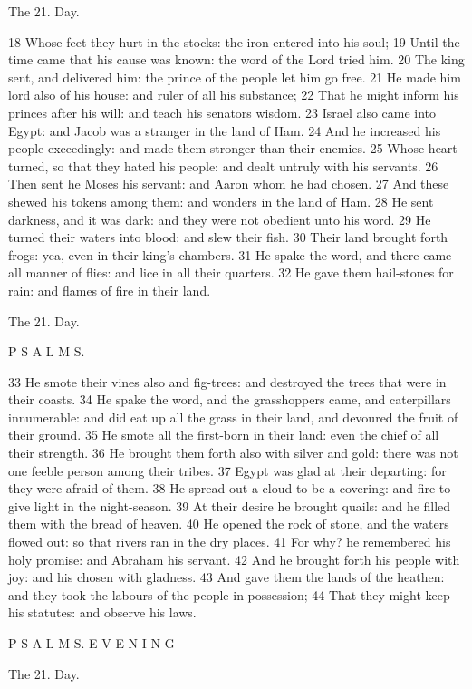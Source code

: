 The 21. Day.

18 Whose feet they hurt in the stocks: the iron entered into his soul; 19 Until the time came that his cause was known: the word of the Lord tried him. 20 The king sent, and delivered him: the prince of the people let him go free. 21 He made him lord also of his house: and ruler of all his substance; 22 That he might inform his princes after his will: and teach his senators wisdom. 23 Israel also came into Egypt: and Jacob was a stranger in the land of Ham. 24 And he increased his people exceedingly: and made them stronger than their enemies. 25 Whose heart turned, so that they hated his people: and dealt untruly with his servants. 26 Then sent he Moses his servant: and Aaron whom he had chosen. 27 And these shewed his tokens among them: and wonders in the land of Ham. 28 He sent darkness, and it was dark: and they were not obedient unto his word. 29 He turned their waters into blood: and slew their fish. 30 Their land brought forth frogs: yea, even in their king’s chambers. 31 He spake the word, and there came all manner of flies: and lice in all their quarters. 32 He gave them hail-stones for rain: and flames of fire in their land.

The 21. Day.

P S A L M S.

33 He smote their vines also and fig-trees: and destroyed the trees that were in their coasts. 34 He spake the word, and the grasshoppers came, and caterpillars innumerable: and did eat up all the grass in their land, and devoured the fruit of their ground. 35 He smote all the first-born in their land: even the chief of all their strength. 36 He brought them forth also with silver and gold: there was not one feeble person among their tribes. 37 Egypt was glad at their departing: for they were afraid of them. 38 He spread out a cloud to be a covering: and fire to give light in the night-season. 39 At their desire he brought quails: and he filled them with the bread of heaven. 40 He opened the rock of stone, and the waters flowed out: so that rivers ran in the dry places. 41 For why? he remembered his holy promise: and Abraham his servant. 42 And he brought forth his people with joy: and his chosen with gladness. 43 And gave them the lands of the heathen: and they took the labours of the people in possession; 44 That they might keep his statutes: and observe his laws.

P S A L M S. E V E N I N G

The 21. Day.

